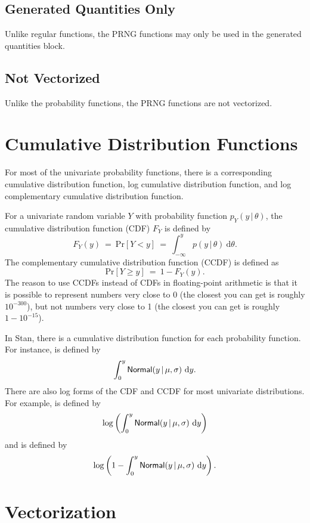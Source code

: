 \subsection{Generated Quantities Only}

Unlike regular functions, the PRNG functions may only be used in the
generated quantities block.

\subsection{Not Vectorized}

Unlike the probability functions, the PRNG functions are not
vectorized.


\section{Cumulative Distribution Functions}

For most of the univariate probability functions, there is a
corresponding cumulative distribution function, log cumulative
distribution function, and log complementary cumulative distribution
function.

For a univariate random variable $Y$ with probability function $p_Y(y \,
| \, \theta)$, the cumulative distribution function (CDF) $F_Y$ is
defined by
\[
F_Y(y) 
\ = \
\mbox{Pr}[Y < y] 
\ = \
\int_{-\infty}^y p(y \, | \, \theta) \ \mathrm{d}\theta.
\]
The complementary cumulative distribution function (CCDF) is defined
as 
\[
\mbox{Pr}[Y \geq y]
\ = \
1 - F_Y(y).
\]
The reason to use CCDFs instead of CDFs in floating-point arithmetic
is that it is possible to represent numbers very close to 0 (the
closest you can get is roughly $10^{-300}$), but not numbers very close
to 1 (the closest you can get is roughly $1 - 10^{-15}$).

In Stan, there is a cumulative distribution function for each
probability function.  For instance, 
is defined by 
%
\[
\int_0^y \distro{Normal}(y \, | \, \mu, \sigma) \ \mathrm{d}y.
\]
%
There are also log forms of the CDF and CCDF for most univariate
distributions.  For example,  is
defined by
%
\[
\log \left( \int_0^y \distro{Normal}(y \, | \, \mu, \sigma) \
  \mathrm{d}y \right)
\]
%
and \code{normal\_lccdf(y | mu,~sigma)} is defined by
%
\[
\log \left( 1 - \int_0^y \distro{Normal}(y \, | \, \mu, \sigma) \
  \mathrm{d}y \right).
\]


\section{Vectorization}\label{vectorization.section}

